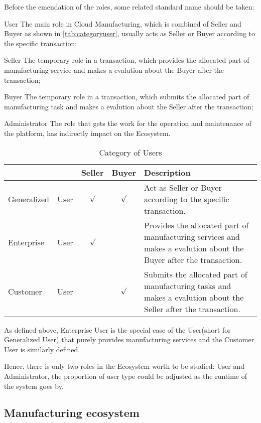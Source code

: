 Before the emendation of the roles, some related standard name should be taken:
\begin{asparadesc}
\item[User] The main role in Cloud Manufacturing, which is combined of Seller and Buyer as shown in \autoref{tab:categoryuser}, usually acts as Seller or Buyer according to the specific transaction;
\item[Seller] The temporary role in a transaction, which provides the allocated part of manufacturing service and makes a evalution about the Buyer after the transaction;
\item[Buyer] The temporary role in a transaction, which submits the allocated part of manufacturing task and makes a evalution about the Seller after the transaction;
\item[Administrator] The role that gets the work for the operation and maintenance of the platform, has indirectly impact on the Ecosystem.
\end{asparadesc}
\begin{table}[htbp]
  \centering\small
  \caption{Category of Users}
    \begin{tabularx}{\textwidth}{llccX}
    \toprule
        &  & Seller & Buyer & Description \\
    \midrule
    Generalized & User & $\surd$ & $\surd$ & Act as Seller or Buyer according to the specific transaction. \\
    Enterprise & User & $\surd$ & &  Provides the allocated part of manufacturing services and makes a evalution about the Buyer after the transaction. \\
    Customer & User& & $\surd$ &  Submits the allocated part of manufacturing tasks and makes a evalution about the Seller after the transaction.\\
    \bottomrule
    \end{tabularx}%
  \label{tab:categoryuser}%
\end{table}%
As defined above, Enterprise User is the special case of the User(short for Generalized User) that purely provides manufacturing services and the Customer User is similarly defined.

Hence, there is only two roles in the Ecosystem worth to be studied: User and Administrator, the proportion of user type could be adjusted as the runtime of the system goes by.



\subsection{Manufacturing ecosystem} %
\label{sub:manufacturing_ecosystem}

